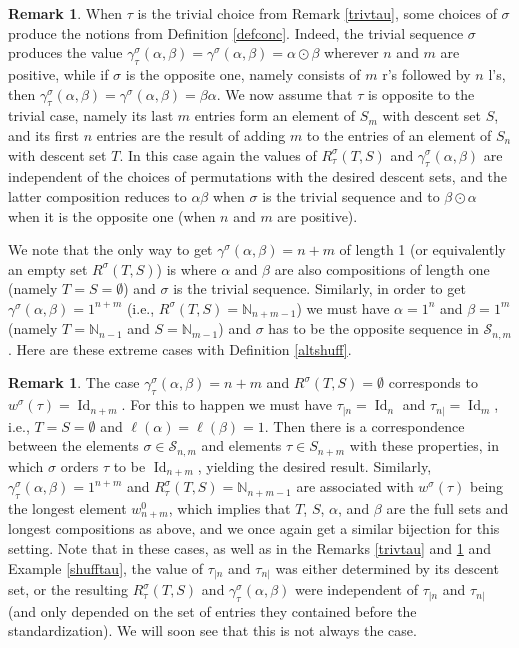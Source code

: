 \documentclass{article}
\theoremstyle{definition}
\newtheorem{rmk}[thm]{Remark}
\begin{document}
\begin{rmk}
When $\tau$ is the trivial choice from Remark \ref{trivtau}, some choices of $\sigma$ produce the notions from Definition \ref{defconc}. Indeed, the trivial sequence $\sigma$ produces the value $\gamma^{\sigma}_{\tau}(\alpha,\beta)=\gamma^{\sigma}(\alpha,\beta)=\alpha\odot\beta$ wherever $n$ and $m$ are positive, while if $\sigma$ is the opposite one, namely consists of $m$ r's followed by $n$ l's, then $\gamma^{\sigma}_{\tau}(\alpha,\beta)=\gamma^{\sigma}(\alpha,\beta)=\beta\alpha$. We now assume that $\tau$ is opposite to the trivial case, namely its last $m$ entries form an element of $S_{m}$ with descent set $S$, and its first $n$ entries are the result of adding $m$ to the entries of an element of $S_{n}$ with descent set $T$. In this case again the values of $R^{\sigma}_{\tau}(T,S)$ and $\gamma^{\sigma}_{\tau}(\alpha,\beta)$ are independent of the choices of permutations with the desired descent sets, and the latter composition reduces to $\alpha\beta$ when $\sigma$ is the trivial sequence and to $\beta\odot\alpha$ when it is the opposite one (when $n$ and $m$ are positive). \label{gammaconc}
\end{rmk}
We note that the only way to get $\gamma^{\sigma}(\alpha,\beta)=n+m$ of length 1 (or equivalently an empty set $R^{\sigma}(T,S)$) is where $\alpha$ and $\beta$ are also compositions of length one (namely $T=S=\emptyset$) and $\sigma$ is the trivial sequence. Similarly, in order to get $\gamma^{\sigma}(\alpha,\beta)=1^{n+m}$ (i.e., $R^{\sigma}(T,S)=\mathbb{N}_{n+m-1}$) we must have $\alpha=1^{n}$ and $\beta=1^{m}$ (namely $T=\mathbb{N}_{n-1}$ and $S=\mathbb{N}_{m-1}$) and $\sigma$ has to be the opposite sequence in $\mathcal{S}_{n,m}$. Here are these extreme cases with Definition \ref{altshuff}.
\begin{rmk}
The case $\gamma^{\sigma}_{\tau}(\alpha,\beta)=n+m$ and $R^{\sigma}(T,S)=\emptyset$ corresponds to $w^{\sigma}(\tau)=\operatorname{Id}_{n+m}$. For this to happen we must have $\tau_{|n}=\operatorname{Id}_{n}$ and $\tau_{n|}=\operatorname{Id}_{m}$, i.e., $T=S=\emptyset$ and $\ell(\alpha)=\ell(\beta)=1$. Then there is a correspondence between the elements $\sigma\in\mathcal{S}_{n,m}$ and elements $\tau \in S_{n+m}$ with these properties, in which $\sigma$ orders $\tau$ to be $\operatorname{Id}_{n+m}$, yielding the desired result. Similarly, $\gamma_{\tau}^{\sigma}(\alpha,\beta)=1^{n+m}$ and $R^{\sigma}_{\tau}(T,S)=\mathbb{N}_{n+m-1}$ are associated with $w^{\sigma}(\tau)$ being the longest element $w^{0}_{n+m}$, which implies that $T$, $S$, $\alpha$, and $\beta$ are the full sets and longest compositions as above, and we once again get a similar bijection for this setting. Note that in these cases, as well as in the Remarks \ref{trivtau} and \ref{gammaconc} and Example \ref{shufftau}, the value of $\tau_{|n}$ and $\tau_{n|}$ was either determined by its descent set, or the resulting $R^{\sigma}_{\tau}(T,S)$ and $\gamma_{\tau}^{\sigma}(\alpha,\beta)$ were independent of $\tau_{|n}$ and $\tau_{n|}$ (and only depended on the set of entries they contained before the standardization). We will soon see that this is not always the case. \label{extreme}
\end{rmk}
\end{document}
